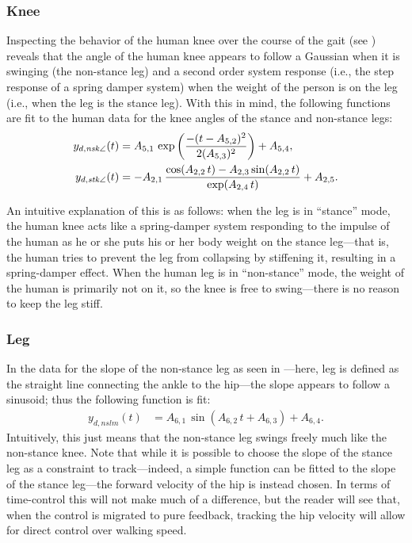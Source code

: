 \subsubsection{Knee}

Inspecting the behavior of the human knee over the course of the gait (see
) reveals that the angle of the human knee appears
to follow a Gaussian when it is swinging (the non-stance leg) and a second order
system response (i.e., the step response of a spring damper system) when the
weight of the person is on the leg (i.e., when the leg is the stance leg).
%
With this in mind, the following functions are fit to the human data for the
knee angles of the stance and non-stance legs:
%
\begin{align*}
  y_{d,\mathit{nsk}\angle}(t) &= A_{5,1} \, \exp\left(\frac{-(t-A_{5,2})^2}{2
      (A_{5,3})^2}\right) + A_{5,4},\\
  y_{d,\mathit{stk}\angle}(t) &= -A_{2,1} \, \frac{\cos(A_{2,2}\,t)-A_{2,3}
    \sin(A_{2,2}\,t)}{\exp(A_{2,4} \, t)} + A_{2,5}. 
\end{align*}
%

An intuitive explanation of this is as follows:
%
when the leg is in ``stance'' mode, the human knee acts like a spring-damper
system responding to the impulse of the human as he or she puts his or her body
weight on the stance leg---that is, the human tries to prevent the leg from
collapsing by stiffening it, resulting in a spring-damper effect.
%
When the human leg is in ``non-stance'' mode, the weight of the human is
primarily not on it, so the knee is free to swing---there is no reason to keep
the leg stiff.


\subsubsection{Leg}

In the data for the slope of the non-stance leg as seen in
---here, leg is defined as the straight line
connecting the ankle to the hip---the slope appears to follow a sinusoid; thus
the following function is fit:
%
\begin{align*}
  y_{d,nslm}(t) &= A_{6,1} \, \sin(A_{6,2} \, t + A_{6,3}) + A_{6,4}.
\end{align*}
%
Intuitively, this just means that the non-stance leg swings freely much like the
non-stance knee.
%
Note that while it is possible to choose the slope of the stance leg as a
constraint to track---indeed, a simple function can be fitted to the slope of
the stance leg---the forward velocity of the hip is instead chosen.
%
In terms of time-control this will not make much of a difference, but the reader
will see that, when the control is migrated to pure feedback, tracking the hip
velocity will allow for direct control over walking speed.


